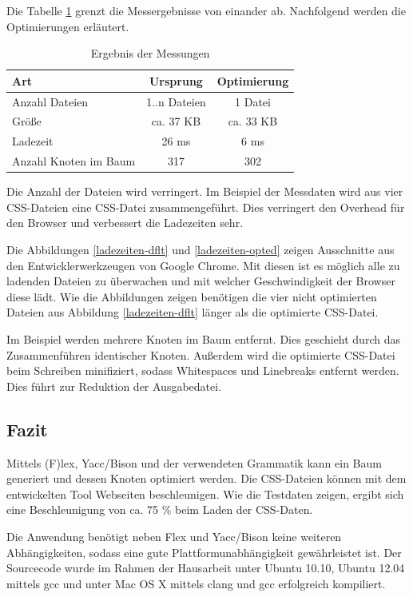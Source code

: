 Die Tabelle \ref{messungen-ergebnis} grenzt die Messergebnisse von einander ab. Nachfolgend werden die Optimierungen erläutert.

\begin{table}[ht!]
	\centering
	\begin{tabular}{l | c | c}
		Art & Ursprung & Optimierung \\
		\hline
		Anzahl Dateien & 1..n Dateien & 1 Datei \\
		Größe & ca. 37 KB & ca. 33 KB \\
		Ladezeit & 26 ms & 6 ms\\
		Anzahl Knoten im Baum & 317 & 302 \\
	\end{tabular}
	\caption{Ergebnis der Messungen}
	\label{messungen-ergebnis}
\end{table}

Die Anzahl der Dateien wird verringert. Im Beispiel der Messdaten wird aus vier CSS-Dateien eine CSS-Datei zusammengeführt. Dies verringert den Overhead für den Browser und verbessert die Ladezeiten sehr. 

Die Abbildungen \ref{ladezeiten-dflt} und \ref{ladezeiten-opted} zeigen Ausschnitte aus den Entwicklerwerkzeugen von Google Chrome. Mit diesen ist es möglich alle zu ladenden Dateien zu überwachen und mit welcher Geschwindigkeit der Browser diese lädt. Wie die Abbildungen zeigen benötigen die vier nicht optimierten Dateien aus Abbildung \ref{ladezeiten-dflt} länger als die optimierte CSS-Datei. 

Im Beispiel werden mehrere Knoten im Baum entfernt. Dies geschieht durch das Zusammenführen identischer Knoten. Außerdem wird die optimierte CSS-Datei beim Schreiben minifiziert, sodass Whitespaces und Linebreaks entfernt werden. Dies führt zur Reduktion der Ausgabedatei. 
 
\pagebreak

\subsection{Fazit}
Mittels (F)lex, Yacc/Bison und der verwendeten Grammatik kann ein Baum generiert und dessen Knoten optimiert werden. Die CSS-Dateien können mit dem entwickelten Tool Webseiten beschleunigen. Wie die Testdaten zeigen, ergibt sich eine Beschleunigung von ca. 75 \% beim Laden der CSS-Daten. 

Die Anwendung benötigt neben Flex und Yacc/Bison keine weiteren Abhängigkeiten, sodass eine gute Plattformunabhängigkeit gewährleistet ist. Der Sourcecode wurde im Rahmen der Hausarbeit unter Ubuntu 10.10, Ubuntu 12.04 mittels gcc und unter Mac OS X mittels clang und gcc erfolgreich kompiliert. 

